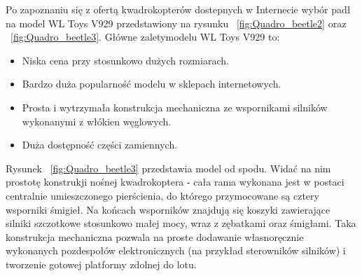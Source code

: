 Po zapoznaniu się z ofertą kwadrokopterów dostepnych w Internecie wybór padł na model WL Toys V929 przedstawiony na rysunku ~\ref{fig:Quadro_beetle2} oraz ~\ref{fig:Quadro_beetle3}. Główne zaletymodelu WL Toys V929 to:

\begin{itemize}
	\item Niska cena przy stosunkowo dużych rozmiarach.
	\item Bardzo duża popularność modelu w sklepach internetowych.
	\item Prosta i wytrzymała konstrukcja mechaniczna ze wspornikami silników wykonanymi z włókien węglowych.
	\item Duża dostępność części zamiennych.
\end{itemize}



Rysunek ~\ref{fig:Quadro_beetle3} przedstawia model od spodu. Widać na nim prostotę konstrukji nośnej kwadrokoptera - cała rama wykonana jest w postaci centralnie umieszczonego pierścienia, do którego przymocowane są cztery wsporniki śmigieł. Na końcach wsporników znajdują się koszyki zawierające silniki szczotkowe stosunkowo małej mocy, wraz z zębatkami oraz śmigłami. Taka konstrukcja mechaniczna pozwala na proste dodawanie własnoręcznie wykonanych pozdespołów elektronicznych (na przykład sterowników silników) i tworzenie gotowej platformy zdolnej do lotu. 

